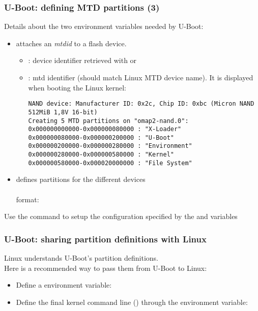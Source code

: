 \begin{frame}[fragile]
  \frametitle{U-Boot: defining MTD partitions (3)}
  Details about the two environment variables needed by U-Boot:
  \begin{itemize}
  \item {} attaches an {\em mtdid} to a flash device.\\
    \begin{itemize}
    \item {}: device identifier retrieved with
       or 
    \item {}: mtd identifier (should match Linux MTD device
      name). It is displayed when booting the Linux kernel:
\tiny
\begin{verbatim}
NAND device: Manufacturer ID: 0x2c, Chip ID: 0xbc (Micron NAND 512MiB 1,8V 16-bit)
Creating 5 MTD partitions on "omap2-nand.0":
0x000000000000-0x000000080000 : "X-Loader"
0x000000080000-0x000000200000 : "U-Boot"
0x000000200000-0x000000280000 : "Environment"
0x000000280000-0x000000580000 : "Kernel"
0x000000580000-0x000020000000 : "File System"
\end{verbatim}
    \end{itemize}
  \item {} defines partitions for the different devices\\
  \\
   format: 
  \end{itemize}
  Use the  command to setup the configuration
  specified by the  and  variables
\end{frame}

\begin{frame}
  \frametitle{U-Boot: sharing partition definitions with Linux}
  Linux understands U-Boot's  partition definitions.\\
  Here is a recommended way to pass them from U-Boot to Linux:
  \begin{itemize}
  \item Define a  environment variable:\\
  \item Define the final kernel command line ()
    through the  environment variable:
  \end{itemize}
\end{frame}

